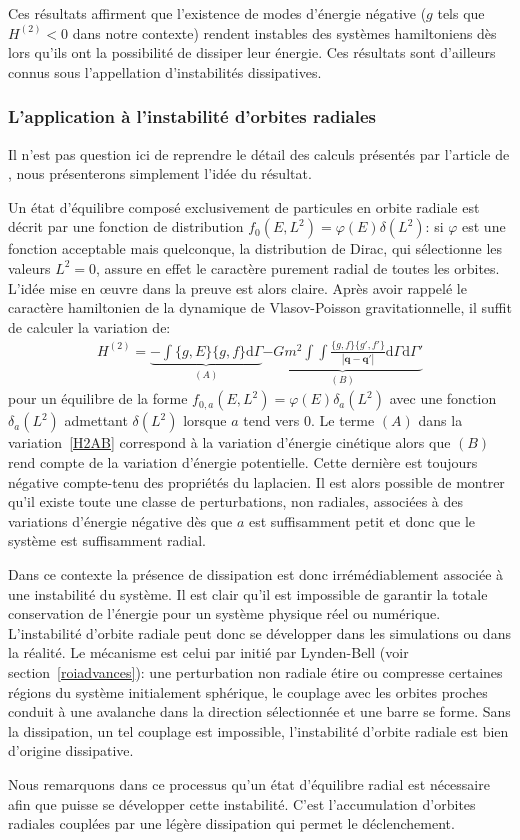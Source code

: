 Ces résultats affirment que l'existence de modes d'énergie négative ($g$ tels que $H^{(2)}<0$ dans notre contexte) rendent instables des systèmes
hamiltoniens dès lors qu'ils ont la possibilité de dissiper leur énergie. Ces résultats sont d'ailleurs connus sous l'appellation \og d'instabilités
dissipatives\fg.



\subsubsection{L'application à l'instabilité d'orbites radiales}

Il n'est pas question ici de reprendre le détail des calculs présentés par l'article de \cite{future}, nous présenterons
simplement l'idée du résultat.

Un état d'équilibre composé exclusivement de particules en orbite radiale est décrit par une fonction de distribution $f_0(E,L^2) = \varphi(E)
\delta(L^2)$: si $\varphi$ est une fonction acceptable mais quelconque, la distribution de Dirac, qui sélectionne les valeurs $L^2=0$,  assure en
effet le caractère purement radial de toutes les orbites. L'idée mise en œuvre dans la preuve est alors claire. Après avoir rappelé le caractère
hamiltonien de la dynamique de Vlasov-Poisson gravitationnelle, il suffit de calculer la variation de:
\begin{align}
	H^{(2)} =
	\underbrace{- \int \{g,E\} \{g,f\} \mathrm{d} \Gamma}_{(A)}
	\underbrace{- G m^2 %
		\int\!\!\!\int \frac{\{g,f\}\{g',f'\}}{|\mathbf{q} - \mathbf{q'}|}
		\mathrm{d} \Gamma \mathrm{d} \Gamma'}_{(B)}
		\label{H2AB}
\end{align}
pour un équilibre de la forme $f_{0,a}(E,L^2) = \varphi(E) \delta_a (L^2)$ avec une fonction $\delta_a (L^2)$ admettant $\delta(L^2)$ lorsque $a$ tend
vers $0$. Le terme $(A)$ dans la variation~\ref{H2AB} correspond à la variation d'énergie cinétique alors que $(B)$ rend compte de la variation
d'énergie potentielle. Cette dernière est toujours négative compte-tenu des propriétés du laplacien. Il est alors possible de montrer qu'il %
existe toute une classe de perturbations, non radiales, associées à des variations d'énergie négative dès que $a$ est suffisamment petit et donc que
le système est suffisamment radial.

Dans ce contexte la présence de dissipation est donc irrémédiablement associée à une instabilité du système. Il est clair qu'il est impossible de
garantir la totale conservation de l'énergie pour un système physique réel ou numérique. L'instabilité d'orbite radiale peut donc se développer dans
les simulations ou dans la réalité. Le mécanisme est celui par initié par Lynden-Bell (voir section~\ref{roiadvances}): une perturbation non
radiale étire ou compresse certaines régions du système initialement sphérique, le couplage avec les orbites proches conduit à une avalanche dans la
direction sélectionnée et une barre se forme. Sans la dissipation, un tel couplage est impossible, l'instabilité d'orbite radiale est bien d'origine
dissipative.

Nous remarquons dans ce processus qu'un état d'équilibre radial est nécessaire afin que puisse se développer cette instabilité. C'est l'accumulation
d'orbites radiales couplées par une légère dissipation qui permet le déclenchement.




